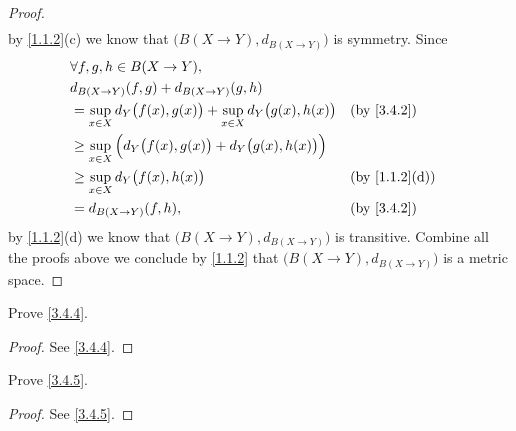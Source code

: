 \begin{proof}
\begin{align*}
  \end{align*}
  by \cref{1.1.2}(c) we know that \(\big(B(X \to Y), d_{B(X \to Y)}\big)\) is symmetry.
  Since
  \begin{align*}
     & \forall f, g, h \in B(X \to Y),                                                                                    \\
     & d_{B(X \to Y)}(f, g) + d_{B(X \to Y)}(g, h)                                                                        \\
     & = \sup_{x \in X} d_Y\big(f(x), g(x)\big) + \sup_{x \in X} d_Y\big(g(x), h(x)\big) &  & \by{3.4.2}                  \\
     & \geq \sup_{x \in X} \Big(d_Y\big(f(x), g(x)\big) + d_Y\big(g(x), h(x)\big)\Big)                                    \\
     & \geq \sup_{x \in X} d_Y\big(f(x), h(x)\big)                                       &  & \text{(by \cref{1.1.2}(d))} \\
     & = d_{B(X \to Y)}(f, h),                                                           &  & \by{3.4.2}
  \end{align*}
  by \cref{1.1.2}(d) we know that \(\big(B(X \to Y), d_{B(X \to Y)}\big)\) is transitive.
  Combine all the proofs above we conclude by \cref{1.1.2} that \(\big(B(X \to Y), d_{B(X \to Y)}\big)\) is a metric space.
\end{proof}

\begin{ex}\label{ex:3.4.2}
  Prove \cref{3.4.4}.
\end{ex}

\begin{proof}
  See \cref{3.4.4}.
\end{proof}

\begin{ex}\label{ex:3.4.3}
  Prove \cref{3.4.5}.
\end{ex}

\begin{proof}
  See \cref{3.4.5}.
\end{proof}

